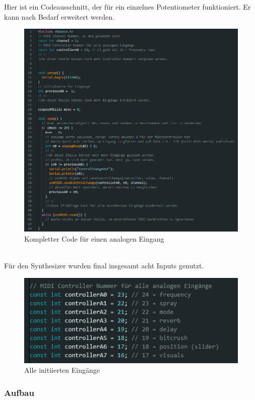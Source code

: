 \documentclass[12pt]{scrartcl}%
\theoremstyle{nonumberplain}
\begin{document}
\newpage
\noindent Hier ist ein Codeausschnitt, der für ein einzelnes Potentiometer funktioniert. Er kann nach Bedarf erweitert werden.
\begin{figure}[h]
\centering
  \includegraphics[scale=0.5]{code_1}
  \caption{Kompletter Code für einen analogen Eingang}
\end{figure}\\
Für den Synthesizer wurden final insgesamt acht Inputs genutzt.
\begin{figure}[h]
\centering
  \includegraphics[scale=0.5]{code_2}
  \caption{Alle initiierten Eingänge}
\end{figure}
\newpage

\subsubsection{Aufbau}
\end{document}
